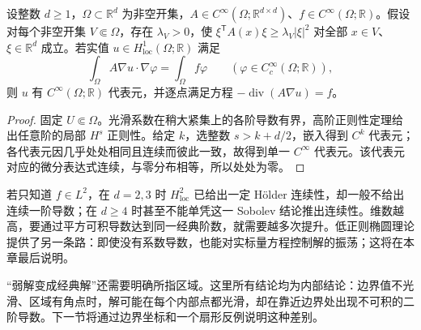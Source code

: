 \begin{corollary}[光滑数据的内部光滑性]
\label{b2:cor:16-smooth-interior}
设整数 \(d\geq1\)，\(\Omega\subset\mathbb R^d\) 为非空开集，\(A\in C^\infty(\Omega;\mathbb R^{d\times d})\)、\(f\in C^\infty(\Omega;\mathbb R)\)。假设对每个非空开集 \(V\Subset\Omega\)，存在 \(\lambda_V>0\)，使 \(\xi^{\mathsf T}A(x)\xi\geq\lambda_V|\xi|^2\) 对全部 \(x\in V\)、\(\xi\in\mathbb R^d\) 成立。若实值 \(u\in H_{\mathrm{loc}}^1(\Omega;\mathbb R)\) 满足
\[
 \int_\Omega A\nabla u\cdot\nabla\varphi=\int_\Omega f\varphi
 \qquad(\varphi\in C_c^\infty(\Omega;\mathbb R)),
\]
则 \(u\) 有 \(C^\infty(\Omega;\mathbb R)\) 代表元，并逐点满足方程 \(-\operatorname{div}(A\nabla u)=f\)。
\end{corollary}
\begin{proof}
固定 \(U\Subset\Omega\)。光滑系数在稍大紧集上的各阶导数有界，高阶正则性定理给出任意阶的局部 \(H^s\) 正则性。给定 \(k\)，选整数 \(s>k+d/2\)，嵌入得到 \(C^k\) 代表元；各代表元因几乎处处相同且连续而彼此一致，故得到单一 \(C^\infty\) 代表元。该代表元对应的微分表达式连续，与零分布相等，所以处处为零。
\end{proof}

若只知道 \(f\in L^2\)，在 \(d=2,3\) 时 \(H_{\mathrm{loc}}^2\) 已给出一定 Hölder 连续性，却一般不给出连续一阶导数；在 \(d\ge4\) 时甚至不能单凭这一 Sobolev 结论推出连续性。维数越高，要通过平方可积导数达到同一经典阶数，就需要越多次提升。低正则椭圆理论提供了另一条路：即使没有系数导数，也能对实标量方程控制解的振荡；这将在本章最后说明。

\ProseParagraphBreak

“弱解变成经典解”还需要明确所指区域。这里所有结论均为内部结论：边界值不光滑、区域有角点时，解可能在每个内部点都光滑，却在靠近边界处出现不可积的二阶导数。下一节将通过边界坐标和一个扇形反例说明这种差别。
